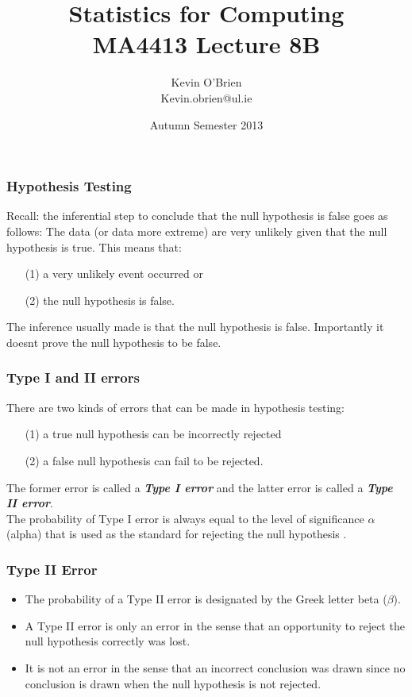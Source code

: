 \documentclass[a4]{beamer}
\title[MA4413]{Statistics for Computing \\ {\normalsize MA4413 Lecture 8B}}
\author[Kevin O'Brien]{Kevin O'Brien \\ {\scriptsize Kevin.obrien@ul.ie}}
\date{Autumn Semester 2013}
\institute[Maths \& Stats]{Dept. of Mathematics \& Statistics, \\ University \textit{of} Limerick}
\begin{document}
\begin{frame}
\frametitle{Hypothesis Testing}
\large
Recall: the inferential step to conclude that the null hypothesis is false goes as follows: The data (or data more extreme) are very unlikely given that the null hypothesis is true.
\bigskip
This means that:
\begin{itemize}\item [(1)] a very unlikely event occurred or
\item[(2)] the null hypothesis is false. \end{itemize}
The inference usually made is that the null hypothesis is false. Importantly it doesnt prove the null hypothesis to be false.
\end{frame}
\begin{frame}
\frametitle{Type I and II errors}
\large
There are two kinds of errors that can be made in hypothesis testing:
\begin{itemize}
\item[(1)] a true null hypothesis can be incorrectly rejected
\item[(2)] a false null hypothesis can fail to be rejected.
\end{itemize}
The former error is called a \textbf{\emph{Type I error}} and the latter error is called a \textbf{\emph{Type II error}}. \\ \bigskip
The probability of Type I error is always equal to the level of significance $\alpha$ (alpha) that is used as the standard for rejecting the null hypothesis .
\end{frame}
\begin{frame}
\frametitle{Type II Error}
\begin{itemize}

\item The probability of a Type II error is designated by the Greek letter beta ($\beta$).
\item A Type II error is only an error in the sense that an opportunity to reject the null hypothesis correctly was lost.
\item It is not an error in the sense that an incorrect conclusion was drawn since no conclusion is drawn when the null hypothesis is not rejected.
\end{itemize}
\end{frame}
\end{document}
